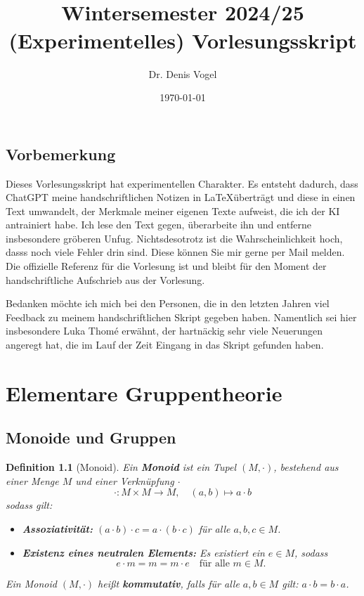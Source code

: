 \documentclass[a4paper, twoside, 11pt, ngerman]{report}
\title{\sffamily {\Huge Algebra 1}\\[1em]
Wintersemester 2024/25\\[1em]
(Experimentelles) Vorlesungsskript}
\author{\sffamily Dr. Denis Vogel}
\date{\sffamily \today}
\theoremstyle{definistyle}
\newtheorem{defini}[satz]{Definition}
\theoremstyle{remark}
\newcommand{\defn}[1]{\textit{\bfseries #1}}
\begin{document}
\maketitle
\addtocounter{page}{1}
\titlepage

\newpage
\section*{Vorbemerkung}
Dieses Vorlesungsskript hat experimentellen Charakter. Es entsteht dadurch, dass ChatGPT meine
handschriftlichen Notizen in \LaTeX überträgt und diese in einen Text umwandelt, der Merkmale meiner eigenen Texte aufweist, die ich der KI antrainiert habe. Ich lese den Text gegen, überarbeite ihn und entferne insbesondere gröberen Unfug. Nichtsdesotrotz ist die Wahrscheinlichkeit hoch, dasss noch viele Fehler drin sind. Diese können Sie mir gerne per Mail melden. Die offizielle Referenz für die Vorlesung ist und bleibt für den Moment der handschriftliche Aufschrieb aus der Vorlesung.

Bedanken möchte ich mich bei den Personen, die in den letzten Jahren viel Feedback zu meinem handschriftlichen Skript gegeben haben. Namentlich sei hier insbesondere Luka Thom\'{e} erwähnt,
der hartnäckig sehr viele Neuerungen angeregt hat, die im Lauf der Zeit Eingang in das Skript gefunden haben.
\newpage

\tableofcontents

\chapter{Elementare Gruppentheorie}
\section{Monoide und Gruppen}

\begin{defini}[Monoid]\label{def:monoid}
Ein \defn{Monoid} ist ein Tupel $ (M, \cdot) $, bestehend aus einer Menge $ M $ und einer Verknüpfung $ \cdot $
\[
\cdot : M \times M \rightarrow M, \quad (a, b) \mapsto a \cdot b
\]
sodass gilt:
\begin{itemize}
    \item[(M1)] \textbf{Assoziativität:} $ (a \cdot b) \cdot c = a \cdot (b \cdot c) $ für alle $ a, b, c \in M $.
    \item[(M2)] \textbf{Existenz eines neutralen Elements:} Es existiert ein $ e \in M $, sodass
    \[
    e \cdot m = m = m \cdot e \quad \text{für alle } m \in M.
    \]
\end{itemize}
Ein Monoid $ (M, \cdot) $ heißt \defn{kommutativ}, falls für alle $ a, b \in M $ gilt: $ a \cdot b = b \cdot a $.
\end{defini}
\end{document}
